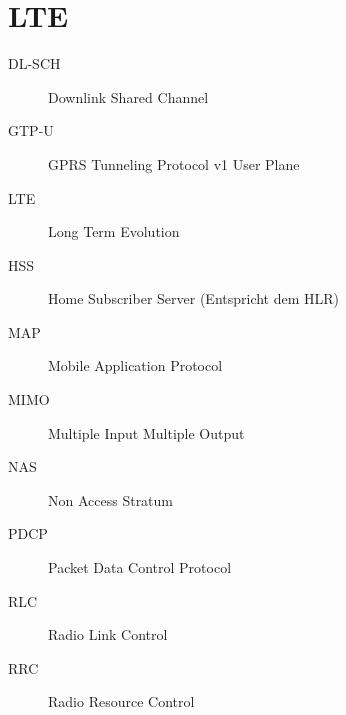 \documentclass[10pt,a4paper]{scrartcl}
\begin{document}
\section{LTE}

\begin{description}
	\item[DL-SCH] Downlink Shared Channel
	\item[GTP-U] GPRS Tunneling Protocol v1 User Plane
	\item[LTE] Long Term Evolution
	\item[HSS] Home Subscriber Server (Entspricht dem HLR)
	\item[MAP] Mobile Application Protocol
	\item[MIMO] Multiple Input Multiple Output
	\item[NAS] Non Access Stratum
	\item[PDCP] Packet Data Control Protocol
	\item[RLC] Radio Link Control
	\item[RRC] Radio Resource Control
\end{description}
\end{document}
